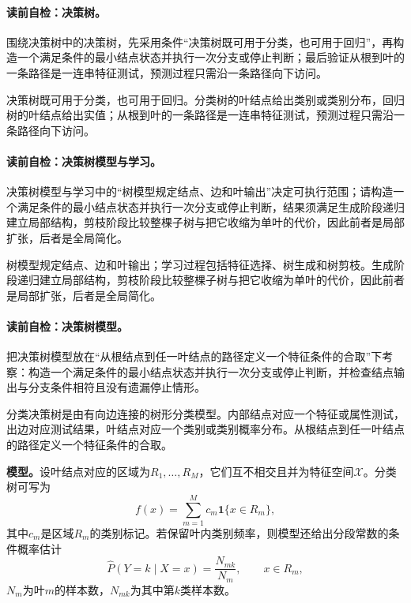 \paragraph{读前自检：决策树。}围绕决策树中的决策树，先采用条件“决策树既可用于分类，也可用于回归”，再构造一个满足条件的最小结点状态并执行一次分支或停止判断；最后验证从根到叶的一条路径是一连串特征测试，预测过程只需沿一条路径向下访问。\par

决策树既可用于分类，也可用于回归。分类树的叶结点给出类别或类别分布，回归树的叶结点给出实值；从根到叶的一条路径是一连串特征测试，预测过程只需沿一条路径向下访问。

\paragraph{读前自检：决策树模型与学习。}决策树模型与学习中的“树模型规定结点、边和叶输出”决定可执行范围；请构造一个满足条件的最小结点状态并执行一次分支或停止判断，结果须满足生成阶段递归建立局部结构，剪枝阶段比较整棵子树与把它收缩为单叶的代价，因此前者是局部扩张，后者是全局简化。\par

树模型规定结点、边和叶输出；学习过程包括特征选择、树生成和树剪枝。生成阶段递归建立局部结构，剪枝阶段比较整棵子树与把它收缩为单叶的代价，因此前者是局部扩张，后者是全局简化。

\paragraph{读前自检：决策树模型。}把决策树模型放在“从根结点到任一叶结点的路径定义一个特征条件的合取”下考察：构造一个满足条件的最小结点状态并执行一次分支或停止判断，并检查结点输出与分支条件相符且没有遗漏停止情形。\par

\label{struct:V2-C04-CH07}
\begin{definition}[分类决策树]
分类决策树是由有向边连接的树形分类模型。内部结点对应一个特征或属性测试，出边对应测试结果，叶结点对应一个类别或类别概率分布。从根结点到任一叶结点的路径定义一个特征条件的合取。
\end{definition}

\label{struct:V2-C04-CH08}
\textbf{模型。}设叶结点对应的区域为$R_1,\ldots,R_M$，它们互不相交且并为特征空间$\mathcal X$。分类树可写为
\[
f(x)=\sum_{m=1}^{M}c_m\mathbf 1\{x\in R_m\},
\]
其中$c_m$是区域$R_m$的类别标记。若保留叶内类别频率，则模型还给出分段常数的条件概率估计
\[
\widehat P(Y=k\mid X=x)=\frac{N_{mk}}{N_m},\qquad x\in R_m,
\]
$N_m$为叶$m$的样本数，$N_{mk}$为其中第$k$类样本数。

